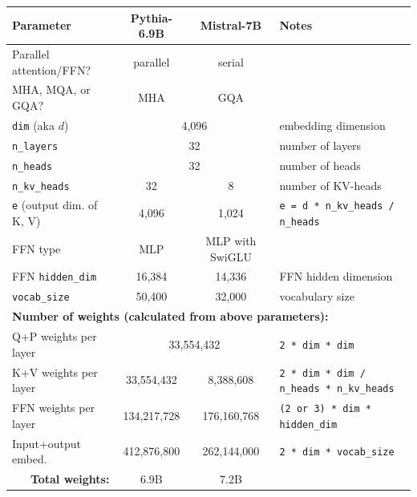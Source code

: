 \documentclass{article}
\begin{document}
\begingroup
\renewcommand{\arraystretch}{1.2} %
\begin{center} \begin{tabular}{lccl}                                                                      \hline
  \textbf{Parameter} & \textbf{Pythia-6.9B} & \textbf{Mistral-7B} & \textbf{Notes}                          \\ \hline
  Parallel attention/FFN? & parallel     & serial           & \cite{parallel}                               \\
  MHA, MQA, or GQA?       & MHA          & GQA              & \cite{vanilla, MQA, GQA}                      \\
  \verb+dim+ (aka $d$)    & \multicolumn{2}{c}{4,096}       & embedding dimension                           \\
  \verb+n_layers+         & \multicolumn{2}{c}{32}          & number of layers                              \\
  \verb+n_heads+          & \multicolumn{2}{c}{32}          & number of heads                               \\
  \verb+n_kv_heads+       & 32           & 8                & number of KV-heads                            \\
  \verb+e+ (output dim. of K, V) & 4,096 & 1,024            & \verb+e = d * n_kv_heads / n_heads+           \\
  FFN type                & MLP          & MLP with SwiGLU  & \cite{GLU}                                    \\
  FFN \verb+hidden_dim+   & 16,384       & 14,336           & FFN hidden dimension                          \\
  \verb+vocab_size+       & 50,400       & 32,000           & vocabulary size                               \\ \hline

  \multicolumn{4}{l}{\textbf{Number of weights (calculated from above parameters):}}                        \\ \hline
  Q+P weights per layer   & \multicolumn{2}{c}{33,554,432}  & \verb+2 * dim * dim+                          \\
  K+V weights per layer   & 33,554,432   &   8,388,608      & \verb+2 * dim * dim / n_heads * n_kv_heads+   \\
  FFN weights per layer   & 134,217,728  & 176,160,768      & \verb+(2 or 3) * dim * hidden_dim+            \\
  Input+output embed.     & 412,876,800  & 262,144,000      & \verb+2 * dim * vocab_size+                   \\
  \multicolumn{1}{r}{\textbf{Total weights:}} & 6.9B & 7.2B &                                               \\ \hline


\end{tabular}
\end{center}
\end{document}
